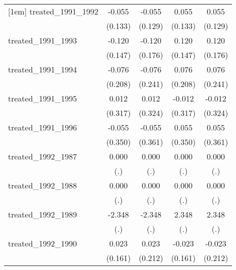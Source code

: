 {\begin{tabular}{l*{4}{c}}
[1em]
treated\_1991\_1992&      -0.055         &      -0.055         &       0.055         &       0.055         \\
            &     (0.133)         &     (0.129)         &     (0.133)         &     (0.129)         \\
[1em]
treated\_1991\_1993&      -0.120         &      -0.120         &       0.120         &       0.120         \\
            &     (0.147)         &     (0.176)         &     (0.147)         &     (0.176)         \\
[1em]
treated\_1991\_1994&      -0.076         &      -0.076         &       0.076         &       0.076         \\
            &     (0.208)         &     (0.241)         &     (0.208)         &     (0.241)         \\
[1em]
treated\_1991\_1995&       0.012         &       0.012         &      -0.012         &      -0.012         \\
            &     (0.317)         &     (0.324)         &     (0.317)         &     (0.324)         \\
[1em]
treated\_1991\_1996&      -0.055         &      -0.055         &       0.055         &       0.055         \\
            &     (0.350)         &     (0.361)         &     (0.350)         &     (0.361)         \\
[1em]
treated\_1992\_1987&       0.000         &       0.000         &       0.000         &       0.000         \\
            &         (.)         &         (.)         &         (.)         &         (.)         \\
[1em]
treated\_1992\_1988&       0.000         &       0.000         &       0.000         &       0.000         \\
            &         (.)         &         (.)         &         (.)         &         (.)         \\
[1em]
treated\_1992\_1989&      -2.348         &      -2.348         &       2.348         &       2.348         \\
            &         (.)         &         (.)         &         (.)         &         (.)         \\
[1em]
treated\_1992\_1990&       0.023         &       0.023         &      -0.023         &      -0.023         \\
            &     (0.161)         &     (0.212)         &     (0.161)         &     (0.212)         \\

\end{tabular}}
